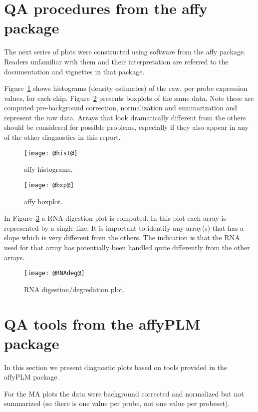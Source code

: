 \documentclass[11pt]{article}
\newcommand{\Rpackage}[1]{{\textsf{#1}}}
\begin{document}
\section{QA procedures from the \Rpackage{affy} package}

The next series of plots were constructed using software from the 
\Rpackage{affy} package. Readers unfamiliar with them and their
interpretation are referred to the documentation and vignettes in
that package.

Figure~\ref{fig:hist} shows histograms (density estimates) of the raw, 
per probe expression values, for each chip. Figure~\ref{fig:bxp}
presents boxplots of the same data.  Note these are computed pre-background
correction, normalization and summarization and represent the raw
data. Arrays that look dramatically different from the others should be 
considered for possible problems, especially if they also appear in any
of the other diagnostics in this report.

\begin{figure}[tp]
  \centering
\texttt{[image: @hist@]}
\caption{\label{fig:hist}%
affy histograms.}
\end{figure}

\begin{figure}[tp]
  \centering
\texttt{[image: @bxp@]}
\caption{\label{fig:bxp}%
affy boxplot.}
\end{figure}


In Figure~\ref{fig:rnadeg} a RNA digestion plot is computed. In this plot
each array is represented by a single line. It is important to identify 
any array(s) that has a slope which is very different from the others. 
The indication is that the RNA used for that array has potentially 
been handled quite differently from the other arrays. 

\begin{figure}[tp]
  \centering
\texttt{[image: @RNAdeg@]}
\caption{\label{fig:rnadeg}%
RNA digestion/degredation plot.}
\end{figure}

\section{QA tools from the \Rpackage{affyPLM} package}

In this section we present diagnostic plots based on tools provided
in the \Rpackage{affyPLM} package.

For the MA plots the data were background corrected and normalized 
but not summarized (so there is one value per probe, not one value
per probeset). 
\end{document}
